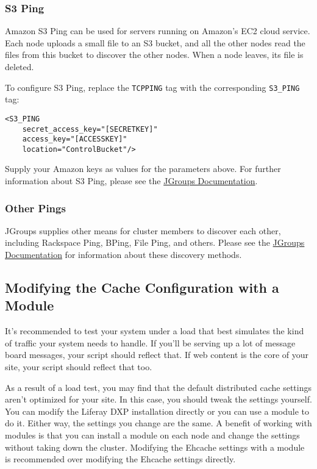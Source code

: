 \subsubsection{S3 Ping}\label{s3-ping}

Amazon S3 Ping can be used for servers running on Amazon's EC2 cloud
service. Each node uploads a small file to an S3 bucket, and all the
other nodes read the files from this bucket to discover the other nodes.
When a node leaves, its file is deleted.

To configure S3 Ping, replace the \texttt{TCPPING} tag with the
corresponding \texttt{S3\_PING} tag:

\begin{verbatim}
<S3_PING 
    secret_access_key="[SECRETKEY]" 
    access_key="[ACCESSKEY]"
    location="ControlBucket"/>
\end{verbatim}

Supply your Amazon keys as values for the parameters above. For further
information about S3 Ping, please see the
\href{http://www.jgroups.org/manual-3.x/html/protlist.html\#DiscoveryProtocols}{JGroups
Documentation}.

\subsubsection{Other Pings}\label{other-pings}

JGroups supplies other means for cluster members to discover each other,
including Rackspace Ping, BPing, File Ping, and others. Please see the
\href{http://www.jgroups.org/manual-3.x/html/protlist.html\#DiscoveryProtocols}{JGroups
Documentation} for information about these discovery methods.

\subsection{Modifying the Cache Configuration with a
Module}\label{modifying-the-cache-configuration-with-a-module}

It's recommended to test your system under a load that best simulates
the kind of traffic your system needs to handle. If you'll be serving up
a lot of message board messages, your script should reflect that. If web
content is the core of your site, your script should reflect that too.

As a result of a load test, you may find that the default distributed
cache settings aren't optimized for your site. In this case, you should
tweak the settings yourself. You can modify the Liferay DXP installation
directly or you can use a module to do it. Either way, the settings you
change are the same. A benefit of working with modules is that you can
install a module on each node and change the settings without taking
down the cluster. Modifying the Ehcache settings with a module is
recommended over modifying the Ehcache settings directly.

